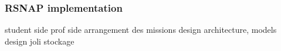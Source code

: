 \subsubsection{RSNAP implementation}
student side
prof side
arrangement des missions
design architecture, models
design joli
stockage
